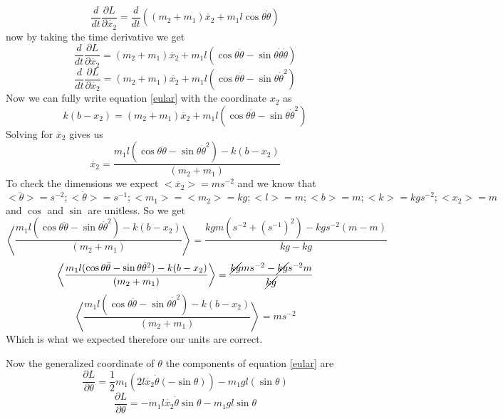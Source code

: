 \documentclass[11pt]{article}
\numberwithin{equation}{section}
\begin{document}
\begin{enumerate}[(a)]
$$\frac{d}{dt}\frac{\partial L}{\partial \dot{x_2}} = \frac{d}{dt}\left((m_2 + m_1)\dot{x_2} + m_1l\cos{\theta}\dot{\theta}\right)$$
now by taking the time derivative we get
$$\frac{d}{dt}\frac{\partial L}{\partial \dot{x_2}} = (m_2 + m_1)\ddot{x_2} + m_1l(\cos{\theta}\ddot{\theta} - \sin{\theta}\dot{\theta}\dot{\theta})$$
$$\frac{d}{dt}\frac{\partial L}{\partial \dot{x_2}} = (m_2 + m_1)\ddot{x_2} + m_1l(\cos{\theta}\ddot{\theta} - \sin{\theta}\dot{\theta}^2)$$
Now we can fully write equation \ref{eular} with the coordinate $x_2$ as
$$k(b-x_2) = (m_2 + m_1)\ddot{x_2} + m_1l(\cos{\theta}\ddot{\theta} - \sin{\theta}\dot{\theta}^2)$$
Solving for $\ddot{x_2}$ gives us
\begin{equation}
\ddot{x_2} = \frac{m_1l(\cos{\theta}\ddot{\theta} - \sin{\theta}\dot{\theta}^2) - k(b-x_2)}{(m_2 + m_1)}
\label{x2mot}
\end{equation}
To check the dimensions we expect $<\ddot{x_2}> = m s^{-2}$ and we know that
$$<\ddot{\theta}> = s^{-2}; <\dot{\theta}> = s^{-1}; <m_1> = <m_2> = kg; <l> = m;<b> = m; <k> = kg s^{-2}; <x_2> = m$$ and $\cos$ and $\sin$ are unitless.
So we get
$$\left<\frac{m_1l(\cos{\theta}\ddot{\theta} - \sin{\theta}\dot{\theta}^2) - k(b-x_2)}{(m_2 + m_1)}\right> = \frac{kg m(s^{-2} + (s^{-1})^2) - kg s^{-2}(m - m)}{kg -kg}$$
$$\left<\frac{m_1l(\cos{\theta}\ddot{\theta} - \sin{\theta}\dot{\theta}^2) - k(b-x_2)}{(m_2 + m_1)}\right> = \frac{\cancel{kg} ms^{-2} - \cancel{kg} s^{-2} m}{\cancel{kg}}$$
$$\left<\frac{m_1l(\cos{\theta}\ddot{\theta} - \sin{\theta}\dot{\theta}^2) - k(b-x_2)}{(m_2 + m_1)}\right> = m s^{-2}$$
Which is what we expected therefore our units are correct.

Now the generalized coordinate of $\theta$ the components of equation \ref{eular} are
$$\frac{\partial L}{\partial \theta} = \frac{1}{2}m_1(2l\dot{x_2}\dot{\theta}(-\sin{\theta})) - m_1gl(\sin{\theta}) $$
$$\frac{\partial L}{\partial \theta} = -m_1l\dot{x_2}\dot{\theta}\sin{\theta} - m_1gl\sin{\theta} $$


\end{enumerate}
\end{document}
